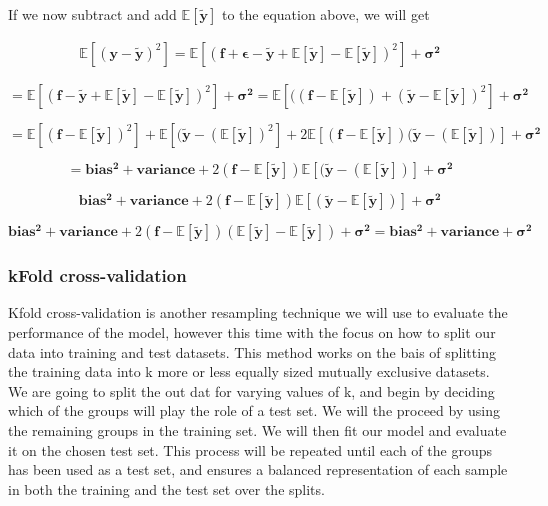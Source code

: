 \documentclass[a4paper, 10pt]{article}
\begin{document}
If we now subtract and add $\mathbb{E}[\boldsymbol{\tilde{y}}]$ to the equation above, we will get 

\begin{gather*}
\mathbb{E}\left[(\boldsymbol{y}-\boldsymbol{\tilde{y}})^2\right]=\mathbb{E}\left[(\boldsymbol{f}+\boldsymbol{\epsilon}-\boldsymbol{\tilde{y}}+\mathbb{E}\left[\boldsymbol{\tilde{y}}\right]-\mathbb{E}\left[\boldsymbol{\tilde{y}}\right])^2\right] + \boldsymbol{\sigma^2}
\end{gather*}

$$
 = 
\mathbb{E}[(\boldsymbol{f}-\boldsymbol{\tilde{y}} +\mathbb{E}[\boldsymbol{\tilde{y}}]-\mathbb{E}[\boldsymbol{\tilde{y}}])^2] + \boldsymbol{\sigma^2} = \mathbb{E}[((\boldsymbol{f}-\mathbb{E}[\boldsymbol{\tilde{y}}]) + (\boldsymbol{\tilde{y}} - \mathbb{E}[\boldsymbol{\tilde{y}}])^2]  + \boldsymbol{\sigma^2}
$$

$$
= \mathbb{E}[(\boldsymbol{f}-\mathbb{E}[\boldsymbol{\tilde{y}}])^2] + \mathbb{E}[(\boldsymbol{\tilde{y}} - (\mathbb{E}[\boldsymbol{\tilde{y}}])^2] + 2\mathbb{E}[(\boldsymbol{f}-\mathbb{E}[\boldsymbol{\tilde{y}}])(\boldsymbol{\tilde{y}} - (\mathbb{E}[\boldsymbol{\tilde{y}}])] + \boldsymbol{\sigma^2}
$$


$$
 = \boldsymbol{bias^2} + \boldsymbol{variance} + 2(\boldsymbol{f}-\mathbb{E}[\boldsymbol{\tilde{y}}])\mathbb{E}[(\boldsymbol{\tilde{y}} - (\mathbb{E}[\boldsymbol{\tilde{y}}])] + \boldsymbol{\sigma^2}
$$

$$
\boldsymbol{bias^2} + \boldsymbol{variance} + 2(\boldsymbol{f}-\mathbb{E}[\boldsymbol{\tilde{y}}]) \mathbb{E}[(\boldsymbol{\tilde{y}} - \mathbb{E}[\boldsymbol{\tilde{y}}])]  + \boldsymbol{\sigma^2}
$$

$$
\boldsymbol{bias^2} + \boldsymbol{variance} + 2(\boldsymbol{f}-\mathbb{E}[\boldsymbol{\tilde{y}}])(\mathbb{E}[\boldsymbol{\tilde{y}}] - \mathbb{E}[\boldsymbol{\tilde{y}}] ) + \boldsymbol{\sigma^2} = \boldsymbol{bias^2} + \boldsymbol{variance} + \boldsymbol{\sigma^2} 
$$

\subsubsection{kFold cross-validation}
Kfold cross-validation is another resampling technique we will use to evaluate the performance of the model, however this time with the focus on how to split our data into training and test datasets. This method works on the bais of splitting the training data into k more or less equally sized mutually exclusive datasets. We are going to split the out dat for varying values of k, and begin by deciding which of the groups will play the role of a test set. We will the proceed by using the remaining groups in the training set. We will then fit our model and evaluate it on the chosen test set. This process will be repeated until each of the groups has been used as a test set, and ensures a balanced representation of each sample in both the training and the test set over the splits. 
\end{document}
